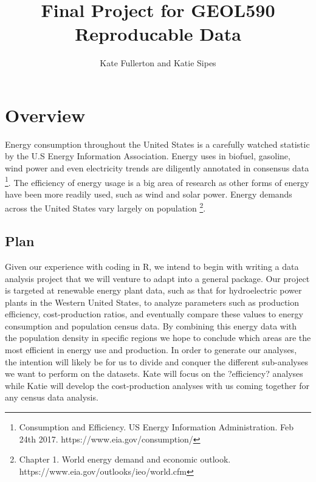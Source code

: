 \documentclass[11pt, oneside]{article}   	%
\title{Final Project for GEOL590 Reproducable Data}
\author{Kate Fullerton and Katie Sipes}
\begin{document}
\maketitle
\section*{Overview}
Energy consumption throughout the United States is a carefully watched statistic by the U.S Energy Information Association. Energy uses in biofuel, gasoline, wind power and even electricity trends are diligently annotated in consensus data \footnote[1]{Consumption and Efficiency. US Energy Information Administration. Feb 24th 2017. https://www.eia.gov/consumption/}. The efficiency of energy usage is a big area of research as other forms of energy have been more readily used, such as wind and solar power. Energy demands across the United States vary largely on population \footnote[2]{Chapter 1. World energy demand and economic outlook. https://www.eia.gov/outlooks/ieo/world.cfm}.

\subsection*{Plan}
Given our experience with coding in R, we intend to begin with writing a data analysis project that we will venture to adapt into a general package. Our project is targeted at renewable energy plant data, such as that for hydroelectric power plants in the Western United States, to analyze parameters such as production efficiency, cost-production ratios, and eventually compare these values to energy consumption and population census data. By combining this energy data with the population density in specific regions  we hope to conclude which areas are the most efficient in energy use and production. In order to generate our analyses, the intention will likely be for us to divide and conquer the different sub-analyses we want to perform on the datasets. Kate will focus on the ?efficiency? analyses while Katie will develop the cost-production analyses with us coming together for any census data analysis. 
\end{document}
